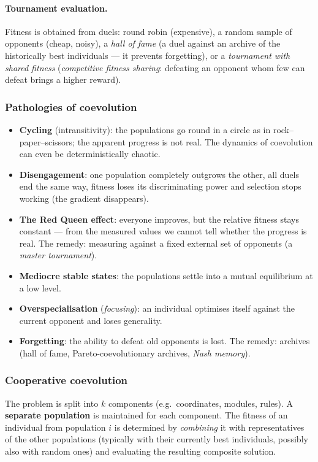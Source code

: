 \documentclass[11pt,a4paper]{article}
\theoremstyle{definition}
\begin{document}
\paragraph{Tournament evaluation.} Fitness is obtained from duels: round robin
(expensive), a random sample of opponents (cheap, noisy), a \emph{hall of fame}
(a duel against an archive of the historically best individuals --- it prevents
forgetting), or a \emph{tournament with shared fitness} (\emph{competitive
fitness sharing}: defeating an opponent whom few can defeat brings a higher
reward).

\subsubsection{Pathologies of coevolution}

\begin{itemize}
\item \textbf{Cycling} (intransitivity): the populations go round in a circle as
  in rock--paper--scissors; the apparent progress is not real. The dynamics of
  coevolution can even be deterministically chaotic.
\item \textbf{Disengagement}: one population completely outgrows the other, all
  duels end the same way, fitness loses its discriminating power and selection
  stops working (the gradient disappears).
\item \textbf{The Red Queen effect}: everyone improves, but the relative fitness
  stays constant --- from the measured values we cannot tell whether the
  progress is real. The remedy: measuring against a fixed external set of
  opponents (a \emph{master tournament}).
\item \textbf{Mediocre stable states}: the populations settle into a mutual
  equilibrium at a low level.
\item \textbf{Overspecialisation} (\emph{focusing}): an individual optimises
  itself against the current opponent and loses generality.
\item \textbf{Forgetting}: the ability to defeat old opponents is lost. The
  remedy: archives (hall of fame, Pareto-coevolutionary archives, \emph{Nash
  memory}).
\end{itemize}

\subsubsection{Cooperative coevolution}

\begin{defbox}
The problem is split into $k$ components (e.g.\ coordinates, modules, rules).
A \textbf{separate population} is maintained for each component. The fitness of
an individual from population $i$ is determined by \emph{combining} it with
representatives of the other populations (typically with their currently best
individuals, possibly also with random ones) and evaluating the resulting
composite solution.
\end{defbox}
\end{document}
